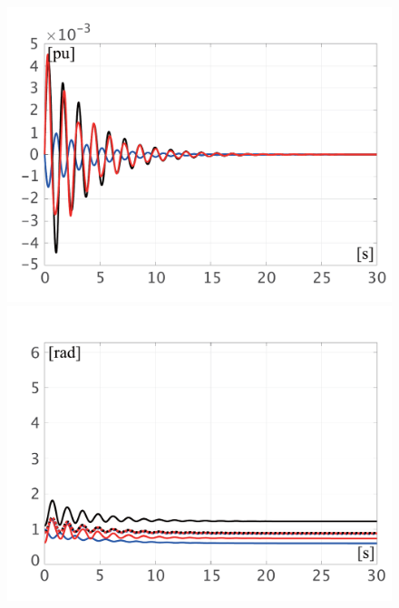 \documentclass[graybox, envcountchap]{svmult}
\begin{document}
\begin{figure}[t]
  \centering
  {
  \begin{minipage}{0.49\linewidth}
    \centering
    \includegraphics[width = 1.0\linewidth]{figs/Domega0}
    \medskip
  \end{minipage}
  \begin{minipage}{0.49\linewidth}
    \centering
    \includegraphics[width = 1.0\linewidth]{figs/delangV0}
    \medskip
  \end{minipage}
 \begin{minipage}{0.49\linewidth}
    \centering

\end{minipage}}
\end{figure}
\end{document}
